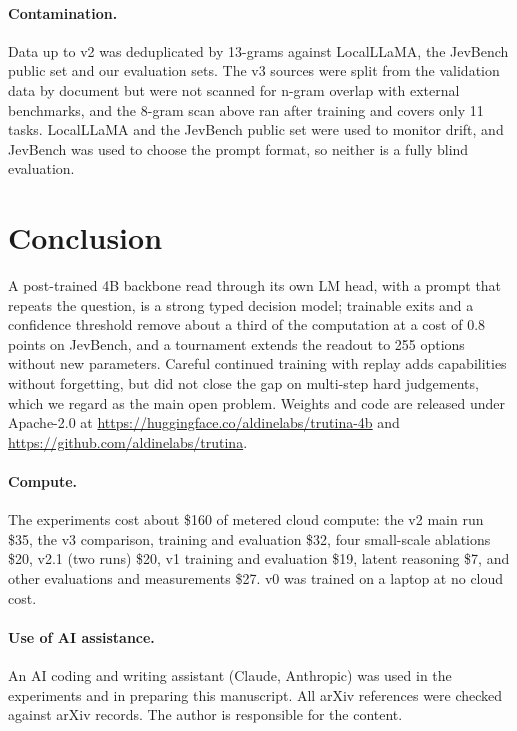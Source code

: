 \documentclass[10pt]{article}
\begin{document}
\paragraph{Contamination.}
Data up to v2 was deduplicated by 13-grams against LocalLLaMA, the JevBench public set and our evaluation sets.
The v3 sources were split from the validation data by document but were not scanned for n-gram overlap with external benchmarks, and the 8-gram scan above ran after training and covers only 11 tasks.
LocalLLaMA and the JevBench public set were used to monitor drift, and JevBench was used to choose the prompt format, so neither is a fully blind evaluation.

\section{Conclusion}

A post-trained 4B backbone read through its own LM head, with a prompt that repeats the question, is a strong typed decision model; trainable exits and a confidence threshold remove about a third of the computation at a cost of 0.8 points on JevBench, and a tournament extends the readout to 255 options without new parameters.
Careful continued training with replay adds capabilities without forgetting, but did not close the gap on multi-step hard judgements, which we regard as the main open problem.
Weights and code are released under Apache-2.0 at \url{https://huggingface.co/aldinelabs/trutina-4b} and \url{https://github.com/aldinelabs/trutina}.

\paragraph{Compute.}
The experiments cost about \$160 of metered cloud compute: the v2 main run \$35, the v3 comparison, training and evaluation \$32, four small-scale ablations \$20, v2.1 (two runs) \$20, v1 training and evaluation \$19, latent reasoning \$7, and other evaluations and measurements \$27.
v0 was trained on a laptop at no cloud cost.

\paragraph{Use of AI assistance.}
An AI coding and writing assistant (Claude, Anthropic) was used in the experiments and in preparing this manuscript.
All arXiv references were checked against arXiv records. The author is responsible for the content.



\end{document}
